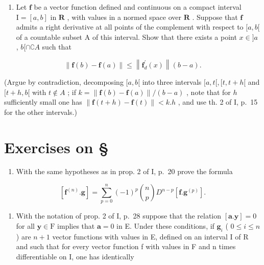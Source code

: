 \begin{enumerate}
\def\labelenumi{\arabic{enumi})}
\setcounter{enumi}{13}
\tightlist
\item
  Let \(\mathbf{f}\) be a vector function defined and continuous on a compact interval \(\mathrm{I} = [a, b]\) in \(\mathbf{R}\) , with values in a normed space over \(\mathbf{R}\) . Suppose that \(\mathbf{f}\) admits a right derivative at all points of the complement with respect to \([a, b[\) of a countable subset A of this interval. Show that there exists a point \(x \in ]a\) , \(b[\cap ∁A\) such that
\end{enumerate}

\[
\left\| \mathbf {f} (b) - \mathbf {f} (a) \right\| \leqslant \left\| \mathbf {f} _ {d} ^ {\prime} (x) \right\| (b - a).
\]

(Argue by contradiction, decomposing \([a, b[\) into three intervals \([a, t[, [t, t + h[\) and \([t + h, b[\) with \(t \notin A\) ; if \(k = \| \mathbf{f}(b) - \mathbf{f}(a)\| / (b - a)\) , note that for \(h\) sufficiently small one has \(\| \mathbf{f}(t + h) - \mathbf{f}(t)\| < k.h\) , and use th. 2 of I, p.~15 for the other intervals.)

\setcounter{exercisegroup}{2}
\section*{Exercises on \S{}}
{}

\begin{enumerate}
\def\labelenumi{\arabic{enumi})}
\tightlist
\item
  With the same hypotheses as in prop. 2 of I, p.~20 prove the formula
\end{enumerate}

\[
[ \mathbf {f} ^ {(n)}. \mathbf {g} ] = \sum_ {p = 0} ^ {n} (- 1) ^ {p} \binom {n} {p} D ^ {n - p} [ \mathbf {f}. \mathbf {g} ^ {(p)} ].
\]

\begin{enumerate}
\def\labelenumi{\arabic{enumi})}
\setcounter{enumi}{1}
\tightlist
\item
  With the notation of prop. 2 of I, p.~28 suppose that the relation \([\mathbf{a}.\mathbf{y}] = 0\) for all \(\mathbf{y} \in \mathrm{F}\) implies that \(\mathbf{a} = 0\) in E. Under these conditions, if \(\mathbf{g}_i\) ( \(0 \leqslant i \leqslant n\) ) are \(n + 1\) vector functions with values in E, defined on an interval I of R and such that for every vector function f with values in F and n times differentiable on I, one has identically
\end{enumerate}

